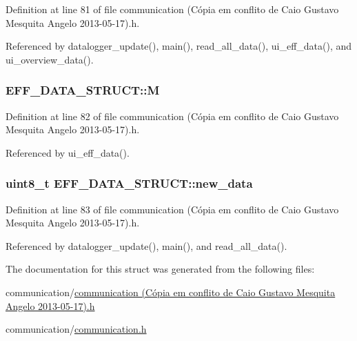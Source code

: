 Definition at line 81 of file communication (\-Cópia em conflito de Caio Gustavo Mesquita Angelo 2013-\/05-\/17).\-h.



Referenced by datalogger\-\_\-update(), main(), read\-\_\-all\-\_\-data(), ui\-\_\-eff\-\_\-data(), and ui\-\_\-overview\-\_\-data().

\hypertarget{structEFF__DATA__STRUCT_aaf6e03b6e600295e0f5c706fc869e9d1}{
\subsubsection[{M}]{ E\-F\-F\-\_\-\-D\-A\-T\-A\-\_\-\-S\-T\-R\-U\-C\-T\-::\-M}}\label{structEFF__DATA__STRUCT_aaf6e03b6e600295e0f5c706fc869e9d1}


Definition at line 82 of file communication (\-Cópia em conflito de Caio Gustavo Mesquita Angelo 2013-\/05-\/17).\-h.



Referenced by ui\-\_\-eff\-\_\-data().

\hypertarget{structEFF__DATA__STRUCT_aa42ebc512dd79fa6ebf998162a149446}{
\subsubsection[{new\-\_\-data}]{\setlength{\rightskip}{0pt plus 5cm}uint8\-\_\-t E\-F\-F\-\_\-\-D\-A\-T\-A\-\_\-\-S\-T\-R\-U\-C\-T\-::new\-\_\-data}}\label{structEFF__DATA__STRUCT_aa42ebc512dd79fa6ebf998162a149446}


Definition at line 83 of file communication (\-Cópia em conflito de Caio Gustavo Mesquita Angelo 2013-\/05-\/17).\-h.



Referenced by datalogger\-\_\-update(), main(), and read\-\_\-all\-\_\-data().



The documentation for this struct was generated from the following files\-:\begin{DoxyCompactItemize}
\item 
communication/\hyperlink{communication_01_07C_xC3_xB3pia_01em_01conflito_01de_01Caio_01Gustavo_01Mesquita_01Angelo_012013-05-17_08_8h}{communication (\-Cópia em conflito de Caio Gustavo Mesquita Angelo 2013-\/05-\/17).\-h}\item 
communication/\hyperlink{communication_2communication_8h}{communication.\-h}\end{DoxyCompactItemize}
